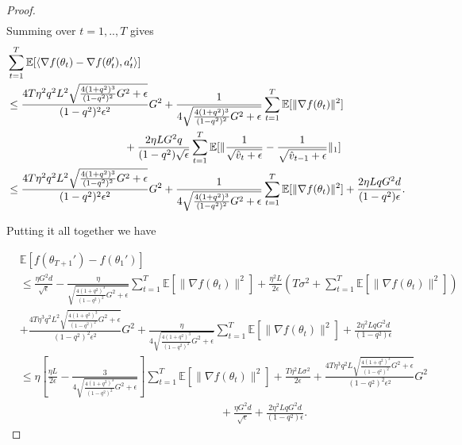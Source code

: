 \documentclass[11pt]{article}
\begin{document}
\begin{proof}
\begin{align*}
\end{align*}
Summing over $t=1,..,T$ gives
\begin{align*}
    &\sum_{t=1}^T \mathbb E[\langle \nabla f(\theta_t)-\nabla f(\theta_t'),a_t'\rangle]\\
    &\leq \frac{4T\eta^2 q^2 L^2\sqrt{\frac{4(1+q^2)^3}{(1-q^2)^2}G^2+\epsilon}}{(1-q^2)^2\epsilon^2}G^2+\frac{1}{4\sqrt{\frac{4(1+q^2)^3}{(1-q^2)^2}G^2+\epsilon}}\sum_{t=1}^T\mathbb E[\|\nabla f(\theta_t)\|^2]\\
    &\hspace{1.5in} +\frac{2\eta LG^2q}{(1-q^2)\sqrt \epsilon} \sum_{t=1}^T \mathbb E[\|\frac{1}{\sqrt{\hat v_t+\epsilon}}-\frac{1}{\sqrt{\hat v_{t-1}+\epsilon}}\|_1]\\
    &\leq \frac{4T\eta^2 q^2 L^2\sqrt{\frac{4(1+q^2)^3}{(1-q^2)^2}G^2+\epsilon}}{(1-q^2)^2\epsilon^2}G^2+\frac{1}{4\sqrt{\frac{4(1+q^2)^3}{(1-q^2)^2}G^2+\epsilon}}\sum_{t=1}^T\mathbb E[\|\nabla f(\theta_t)\|^2]+\frac{2\eta LqG^2d}{(1-q^2)\epsilon} .
\end{align*}


Putting it all together we have 

\begin{align*}
    &\mathbb E[f(\theta_{T+1}')-f(\theta_1')]\\
    &\leq \frac{\eta G^2 d}{\sqrt{\epsilon}} -\frac{\eta}{\sqrt{\frac{4(1+q^2)^3}{(1-q^2)^2}G^2+\epsilon}}     \sum_{t=1}^T\mathbb E[\|\nabla f(\theta_t)\|^2] + \frac{\eta^2L }{2\epsilon} (T\sigma^2+\sum_{t=1}^T\mathbb E[\|\nabla f(\theta_t)\|^2]) \\
    &+ \frac{4T\eta^3 q^2 L^2\sqrt{\frac{4(1+q^2)^3}{(1-q^2)^2}G^2+\epsilon}}{(1-q^2)^2\epsilon^2}G^2+\frac{\eta}{4\sqrt{\frac{4(1+q^2)^3}{(1-q^2)^2}G^2+\epsilon}}\sum_{t=1}^T\mathbb E[\|\nabla f(\theta_t)\|^2]+\frac{2\eta^2 LqG^2d}{(1-q^2)\epsilon}\\
    &\leq \eta \left[ \frac{\eta L }{2\epsilon} - \frac{3}{4\sqrt{\frac{4(1+q^2)^3}{(1-q^2)^2}G^2+\epsilon}}    \right]  \sum_{t=1}^T\mathbb E[\|\nabla f(\theta_t)\|^2] + \frac{T\eta^2 L\sigma^2}{2\epsilon}+ \frac{4T\eta^3 q^2 L\sqrt{\frac{4(1+q^2)^3}{(1-q^2)^2}G^2+\epsilon}}{(1-q^2)^2\epsilon^2}G^2 \\
    & \hspace{3in} + \frac{\eta G^2 d}{\sqrt{\epsilon}}+\frac{2\eta^2 LqG^2d}{(1-q^2)\epsilon}.
\end{align*}


\end{proof}
\end{document}

